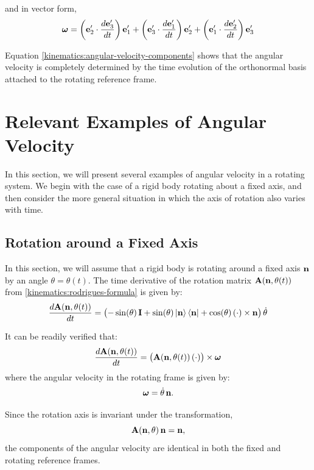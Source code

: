 \documentclass[12pt]{article}
\begin{document}
and in vector form,
\begin{equation}
  \boldsymbol{\omega} =
    \left(\vb{e}'_2 \cdot \frac{d\vb{e}'_3}{dt}\right)\vb{e}'_1
  + \left(\vb{e}'_3 \cdot \frac{d\vb{e}'_1}{dt}\right)\vb{e}'_2
  + \left(\vb{e}'_1 \cdot \frac{d\vb{e}'_2}{dt}\right)\vb{e}'_3
  \label{kinematics:angular-velocity-components}
\end{equation}

Equation \eqref{kinematics:angular-velocity-components} shows that the angular
velocity is completely determined by the time evolution of the orthonormal basis
attached to the rotating reference frame.

\section{Relevant Examples of Angular Velocity}

In this section, we will present several examples of angular velocity in a rotating system.
We begin with the case of a rigid body rotating about a fixed axis, and then consider the more
general situation in which the axis of rotation also varies with time.

\subsection{Rotation around a Fixed Axis}

In this section, we will assume that a rigid body is rotating around a fixed axis $\vb{n}$
by an angle $\theta = \theta(t)$. The time derivative of the rotation matrix
$\vb{A}(\vb{n}, \theta(t))$ from \eqref{kinematics:rodrigues-formula} is given by:
\[
  \frac{d\vb{A}(\vb{n},\theta(t))}{dt} =
  \bigl(-\sin(\theta)\,\vb{I} + \sin(\theta)\ket{\vb{n}}\bra{\vb{n}} + \cos(\theta)\,(\cdot)\times\vb{n}\bigr)\,\dot\theta
\]

It can be readily verified that:
\[
  \frac{d\vb{A}(\vb{n},\theta(t))}{dt} = \bigl(\vb{A}(\vb{n},\theta(t))\,(\cdot)\bigr) \times \boldsymbol{\omega}
\]
where the angular velocity in the rotating frame is given by:
\begin{equation}
  \boldsymbol{\omega} = \dot\theta\,\vb{n}.
  \label{kinematics:fixed-axis-angular-velocity}
\end{equation}

Since the rotation axis is invariant under the transformation,
\[
  \vb{A}(\vb{n},\theta)\,\vb{n}=\vb{n},
\]
the components of the angular velocity are identical in both the fixed and
rotating reference frames.
\end{document}
